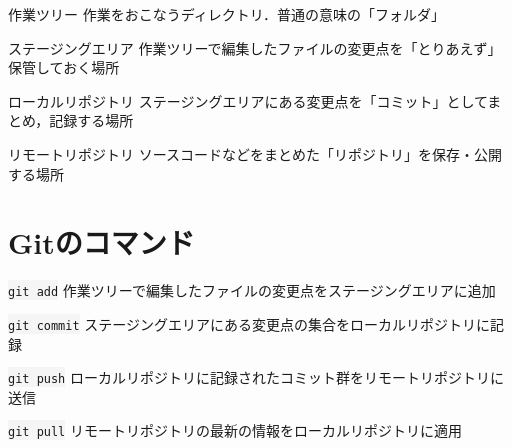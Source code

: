 \documentclass[12pt,dvipdfmx,svgnames,uplatex,aspectratio=169]{beamer}
\newcommand{\git}[1]{{\colorbox{WhiteSmoke}{\texttt{#1}}}}  %
\begin{document}
\begin{frame}{\insertsection}
  \begin{block}{作業ツリー}
    作業をおこなうディレクトリ．普通の意味の「フォルダ」
  \end{block}
  \begin{block}{ステージングエリア}
    作業ツリーで編集したファイルの変更点を「とりあえず」保管しておく場所
  \end{block}
  \begin{block}{ローカルリポジトリ}
    ステージングエリアにある変更点を「コミット」としてまとめ，記録する場所
  \end{block}
  \begin{block}{リモートリポジトリ}
    ソースコードなどをまとめた「リポジトリ」を保存・公開する場所
  \end{block}
\end{frame}

\section{Gitのコマンド}
\begin{frame}{\insertsection}
  \begin{block}{\git{git add}}
    作業ツリーで編集したファイルの変更点をステージングエリアに追加
  \end{block}
  \begin{block}{\git{git commit}}
    ステージングエリアにある変更点の集合をローカルリポジトリに記録
  \end{block}
  \begin{block}{\git{git push}}
    ローカルリポジトリに記録されたコミット群をリモートリポジトリに送信
  \end{block}
  \begin{block}{\git{git pull}}
    リモートリポジトリの最新の情報をローカルリポジトリに適用
  \end{block}
\end{frame}
\end{document}
